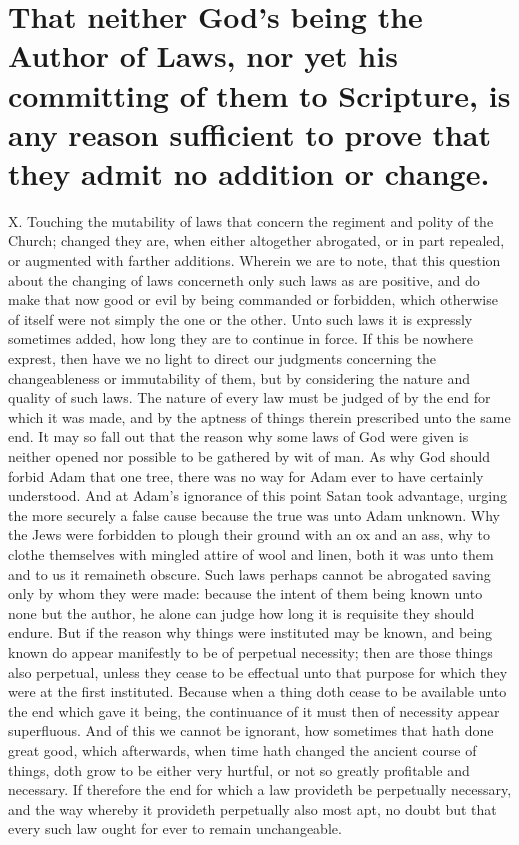 \section*{That neither God’s being the Author of Laws, nor yet his committing of them to Scripture, is any reason sufficient to prove that they admit no addition or change.}

X. Touching the mutability of laws that concern the regiment and polity of the Church; changed they are, when either altogether abrogated, or in part repealed, or augmented with farther additions. Wherein we are to note, that this question about the changing of laws concerneth only such laws as are positive, and do make that now good or evil by being commanded or forbidden, which otherwise of itself were not simply the one or the other. Unto such laws it is expressly sometimes added, how long they are to continue in force. If this be nowhere exprest, then have we no light to direct our judgments concerning the changeableness or immutability of them, but by considering the nature and quality of such laws. The nature of every law must be judged of by the end for which it was made, and by the aptness of things therein prescribed unto the same end. It may so fall out that the reason why some laws of God were given is neither opened nor possible to be gathered by wit of man. As why God should forbid Adam that one tree, there was no way for Adam ever to have certainly understood. And at Adam’s ignorance of this point Satan took advantage, urging the more securely a false cause because the true was unto Adam unknown. Why the Jews were forbidden to plough their ground with an ox and an ass, why to clothe themselves with mingled attire of wool and linen, both it was unto them and to us it remaineth obscure. Such laws perhaps cannot be abrogated saving only by whom they were made: because the intent of them being known unto none but the author, he alone can judge how long it is requisite they should endure. But if the reason why things were instituted may be known, and being known do appear manifestly to be of perpetual necessity; then are those things also perpetual, unless they  cease to be effectual unto that purpose for which they were at the first instituted. Because when a thing doth cease to be available unto the end which gave it being, the continuance of it must then of necessity appear superfluous. And of this we cannot be ignorant, how sometimes that hath done great good, which afterwards, when time hath changed the ancient course of things, doth grow to be either very hurtful, or not so greatly profitable and necessary. If therefore the end for which a law provideth be perpetually necessary, and the way whereby it provideth perpetually also most apt, no doubt but that every such law ought for ever to remain unchangeable.

